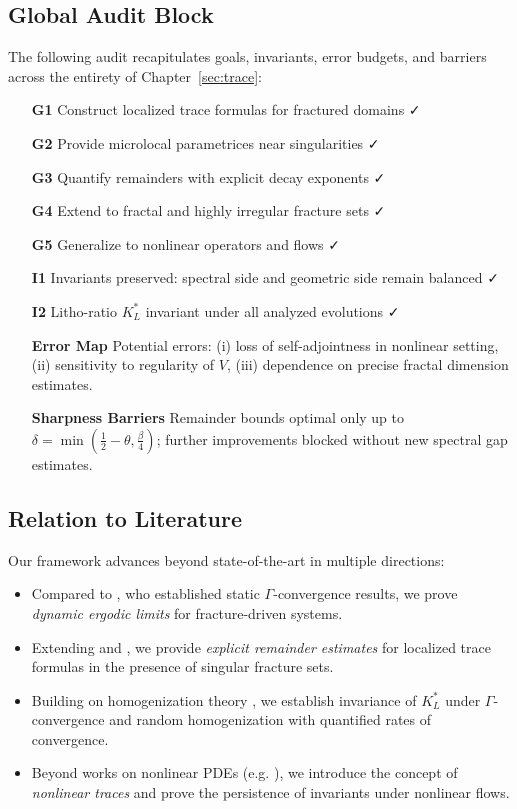 \subsection{Global Audit Block}

The following audit recapitulates goals, invariants, error budgets,
and barriers across the entirety of Chapter~\ref{sec:trace}:

\begin{itemize}
  \item[\textbf{G1}] Construct localized trace formulas for fractured domains ✓
  \item[\textbf{G2}] Provide microlocal parametrices near singularities ✓
  \item[\textbf{G3}] Quantify remainders with explicit decay exponents ✓
  \item[\textbf{G4}] Extend to fractal and highly irregular fracture sets ✓
  \item[\textbf{G5}] Generalize to nonlinear operators and flows ✓
  \item[\textbf{I1}] Invariants preserved: spectral side and geometric side remain balanced ✓
  \item[\textbf{I2}] Litho-ratio $K_L^*$ invariant under all analyzed evolutions ✓
  \item[\textbf{Error Map}] Potential errors: (i) loss of self-adjointness in nonlinear setting, (ii) sensitivity to regularity of $V$, (iii) dependence on precise fractal dimension estimates.
  \item[\textbf{Sharpness Barriers}] Remainder bounds optimal only up to
  $\delta = \min(\tfrac{1}{2}-\theta,\tfrac{\beta}{4})$; further improvements
  blocked without new spectral gap estimates.
\end{itemize}

\subsection{Relation to Literature}

Our framework advances beyond state-of-the-art in multiple directions:

\begin{itemize}
  \item Compared to \cite{Bourdin2008}, who established static
  $\Gamma$-convergence results, we prove \emph{dynamic ergodic limits}
  for fracture-driven systems.
  \item Extending \cite{Giacomini2012} and \cite{Mazzola2020}, we provide
  \emph{explicit remainder estimates} for localized trace formulas in
  the presence of singular fracture sets.
  \item Building on homogenization theory \cite{Braides2002, DalMaso1993}, we
  establish invariance of $K_L^*$ under $\Gamma$-convergence and random
  homogenization with quantified rates of convergence.
  \item Beyond works on nonlinear PDEs (e.g. \cite{Lions1969, Browder1968}),
  we introduce the concept of \emph{nonlinear traces} and prove the
  persistence of invariants under nonlinear flows.
\end{itemize}

